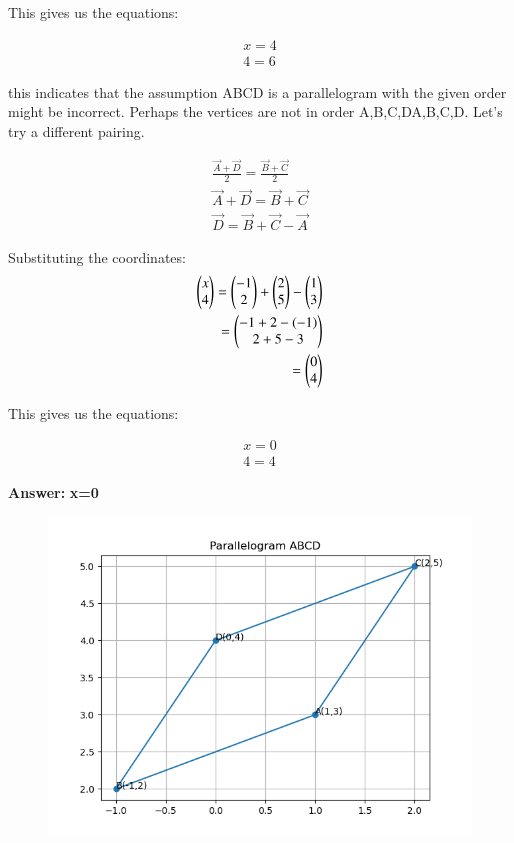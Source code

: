 \documentclass[journal]{IEEEtran}
\begin{document}
This gives us the equations: 

\begin{align}
       x=4\\
       4=6
\end{align}

this indicates that the assumption ABCD is a parallelogram with the given order might be incorrect. Perhaps the vertices are not in order A,B,C,DA,B,C,D. Let's try a different pairing.



\begin{align}
\frac{\vec{A} + \vec{D}}{2} = \frac{\vec{B} + \vec{C}}{2} \\
\vec{A} + \vec{D} = \vec{B} + \vec{C} \\
\vec{D} = \vec{B} + \vec{C} - \vec{A}
\end{align}

Substituting the coordinates:
\begin{align}
\begin{pmatrix} x \\ 4 \end{pmatrix} = \begin{pmatrix} -1 \\ 2 \end{pmatrix} + \begin{pmatrix} 2 \\ 5 \end{pmatrix} - \begin{pmatrix} 1 \\ 3 \end{pmatrix} \\
                 = \begin{pmatrix} -1 + 2 - (-1) \\ 2 + 5 - 3 \end{pmatrix} \\
                 = \begin{pmatrix} 0 \\ 4 \end{pmatrix}
\end{align}

This gives us the equations: 

\begin{align}
    x=0  \\
    4=4
\end{align}

\textbf{Answer:}  
\textbf{x=0}

\begin{figure}[h!]
    \centering
    \includegraphics[height=0.6\textheight, keepaspectratio]{figs/plotc.png}
    \label{figure_1}
\end{figure}
\end{document}
